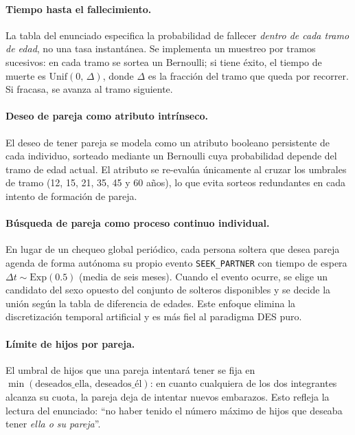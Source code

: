 \documentclass[12pt, a4paper]{article}
\newcommand{\Exp}[1]{\mathrm{Exp}\!\left(#1\right)}
\newcommand{\Unif}[2]{\mathrm{Unif}\!\left(#1,\,#2\right)}
\newcommand{\code}[1]{\texttt{#1}}
\begin{document}
\paragraph{Tiempo hasta el fallecimiento.}
La tabla del enunciado especifica la probabilidad de fallecer \textit{dentro
de cada tramo de edad}, no una tasa instantánea. Se implementa un muestreo
por tramos sucesivos: en cada tramo se sortea un Bernoulli; si tiene éxito,
el tiempo de muerte es $\Unif{0}{\Delta}$, donde $\Delta$ es la fracción del
tramo que queda por recorrer. Si fracasa, se avanza al tramo siguiente.

\paragraph{Deseo de pareja como atributo intrínseco.}
El deseo de tener pareja se modela como un atributo booleano persistente de
cada individuo, sorteado mediante un Bernoulli cuya probabilidad depende del
tramo de edad actual. El atributo se re-evalúa únicamente al cruzar los
umbrales de tramo (12, 15, 21, 35, 45 y 60 años), lo que evita sorteos
redundantes en cada intento de formación de pareja.

\paragraph{Búsqueda de pareja como proceso continuo individual.}
En lugar de un chequeo global periódico, cada persona soltera que desea
pareja agenda de forma autónoma su propio evento \code{SEEK\_PARTNER} con
tiempo de espera $\Delta t \sim \Exp{0.5}$ (media de seis meses). Cuando el
evento ocurre, se elige un candidato del sexo opuesto del conjunto de
solteros disponibles y se decide la unión según la tabla de diferencia de
edades. Este enfoque elimina la discretización temporal artificial y es más
fiel al paradigma DES puro.

\paragraph{Límite de hijos por pareja.}
El umbral de hijos que una pareja intentará tener se fija en
$\min(\text{deseados\_ella},\, \text{deseados\_él})$: en cuanto cualquiera
de los dos integrantes alcanza su cuota, la pareja deja de intentar nuevos
embarazos. Esto refleja la lectura del enunciado: ``no haber tenido el número
máximo de hijos que deseaba tener \textit{ella o su pareja}''.

\end{document}
